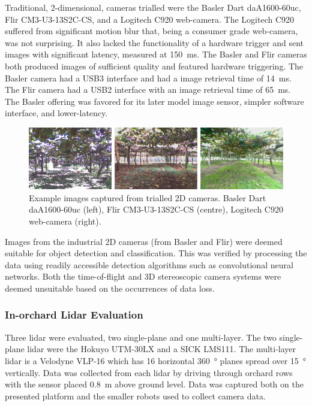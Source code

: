 \documentclass[preprint,authoryear,12pt]{elsarticle}
\begin{document}
        Traditional, 2-dimensional, cameras trialled were the Basler Dart daA1600-60uc, Flir CM3-U3-13S2C-CS, and a Logitech C920 web-camera.
        The Logitech C920 suffered from significant motion blur that, being a consumer grade web-camera, was not surprising.
        It also lacked the functionality of a hardware trigger and sent images with significant latency, measured at \SI{150}{\milli\second}.
        The Basler and Flir cameras both produced images of sufficient quality and featured hardware triggering.
        The Basler camera had a USB3 interface and had a image retrieval time of \SI{14}{\milli\second}.
        The Flir camera had a USB2 interface with an image retrieval time of \SI{65}{\milli\second}.
        The Basler offering was favored for its later model image sensor, simpler software interface, and lower-latency.

        \begin{figure}[htb]
            \centering
            \includegraphics[width=\linewidth]{imgs/camera_comparison/camera_comparison.pdf}
            \caption{
                Example images captured from trialled 2D cameras.
                Basler Dart daA1600-60uc (left), Flir CM3-U3-13S2C-CS (centre), Logitech C920 web-camera (right).
            }
            \label{fig:canopyDataCloud}
        \end{figure}

        Images from the industrial 2D cameras (from Basler and Flir) were deemed suitable for object detection and classification.
        This was verified by processing the data using readily accessible detection algorithms such as convolutional neural networks.
        Both the time-of-flight and 3D stereoscopic camera systems were deemed unsuitable based on the occurrences of data loss.

    \subsubsection{In-orchard Lidar Evaluation}
        Three lidar were evaluated, two single-plane and one multi-layer.
        The two single-plane lidar were the Hokuyo UTM-30LX and a SICK LMS111.
        The multi-layer lidar is a Velodyne VLP-16 which has 16 horizontal \SI{360}{\degree} planes spread over \SI{15}{\degree} vertically.
        Data was collected from each lidar by driving through orchard rows with the sensor placed \SI{0.8}{\meter} above ground level.
        Data was captured both on the presented platform and the smaller robots used to collect camera data.
\end{document}
